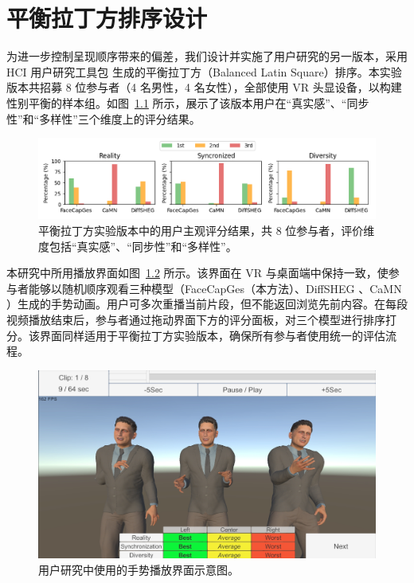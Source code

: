 
\chapter{平衡拉丁方排序设计}

为进一步控制呈现顺序带来的偏差，我们设计并实施了用户研究的另一版本，采用 HCI 用户研究工具包 \cite{LatinSquareToolkit} 生成的平衡拉丁方（Balanced Latin Square）排序。本实验版本共招募 8 位参与者（4 名男性，4 名女性），全部使用 VR 头显设备，以构建性别平衡的样本组。如图~\ref{fig:userstudy_latin_square} 所示，展示了该版本用户在“真实感”、“同步性”和“多样性”三个维度上的评分结果。

\begin{figure}[h]
\centering
\includegraphics[width=\linewidth]{figures/UserStudy_LatinSquare.png}
\caption{平衡拉丁方实验版本中的用户主观评分结果，共 8 位参与者，评价维度包括“真实感”、“同步性”和“多样性”。}
\label{fig:userstudy_latin_square}
\end{figure}

本研究中所用播放界面如图~\ref{fig:userstudy_app} 所示。该界面在 VR 与桌面端中保持一致，使参与者能够以随机顺序观看三种模型（FaceCapGes（本方法）、DiffSHEG \cite{diffsheg}、CaMN \cite{beatcamn}）生成的手势动画。用户可多次重播当前片段，但不能返回浏览先前内容。在每段视频播放结束后，参与者通过拖动界面下方的评分面板，对三个模型进行排序打分。该界面同样适用于平衡拉丁方实验版本，确保所有参与者使用统一的评估流程。

\begin{figure}[h]
\centering
\includegraphics[width=\linewidth]{figures/UserStudyImage.png}
\caption{用户研究中使用的手势播放界面示意图。}
\label{fig:userstudy_app}
\end{figure}
